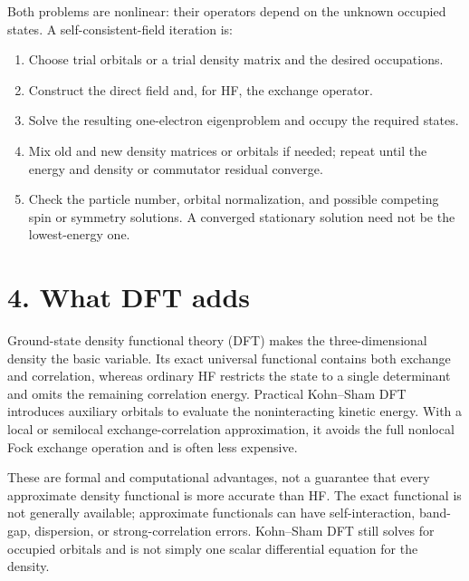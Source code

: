 Both problems are nonlinear: their operators depend on the unknown occupied states. A self-consistent-field iteration is:
\begin{enumerate}
\item Choose trial orbitals or a trial density matrix and the desired occupations.
\item Construct the direct field and, for HF, the exchange operator.
\item Solve the resulting one-electron eigenproblem and occupy the required states.
\item Mix old and new density matrices or orbitals if needed; repeat until the energy and density or commutator residual converge.
\item Check the particle number, orbital normalization, and possible competing spin or symmetry solutions. A converged stationary solution need not be the lowest-energy one.
\end{enumerate}
\begin{center}
\end{center}

\section*{4. What DFT adds}
Ground-state density functional theory (DFT) makes the three-dimensional density the basic variable. Its exact universal functional contains both exchange and correlation, whereas ordinary HF restricts the state to a single determinant and omits the remaining correlation energy. Practical Kohn--Sham DFT introduces auxiliary orbitals to evaluate the noninteracting kinetic energy. With a local or semilocal exchange-correlation approximation, it avoids the full nonlocal Fock exchange operation and is often less expensive.

These are formal and computational advantages, not a guarantee that every approximate density functional is more accurate than HF. The exact functional is not generally available; approximate functionals can have self-interaction, band-gap, dispersion, or strong-correlation errors. Kohn--Sham DFT still solves for occupied orbitals and is not simply one scalar differential equation for the density.

